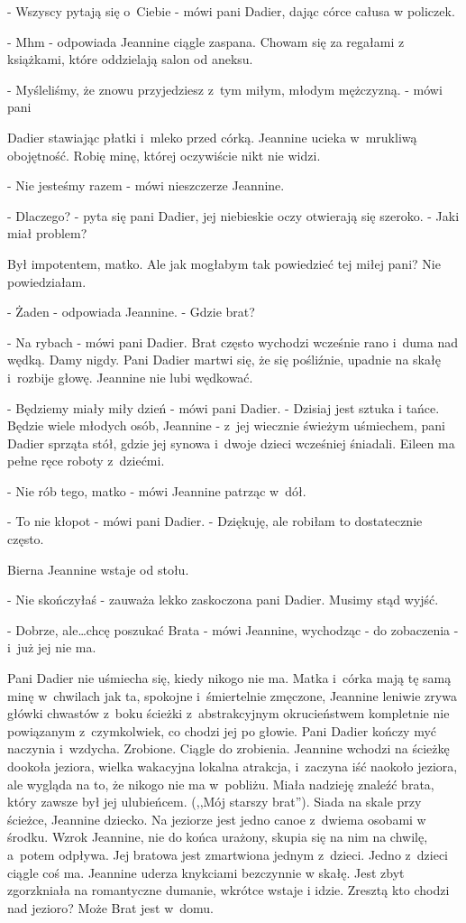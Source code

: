 \documentclass[oneside,polish,12pt,sfheadings]{mwbk}
\begin{document}
- Wszyscy pytają się o~Ciebie - mówi pani Dadier, dając córce całusa
w policzek.

- Mhm - odpowiada Jeannine ciągle zaspana. Chowam się za regałami
z książkami, które oddzielają salon od aneksu.

- Myśleliśmy, że znowu przyjedziesz z~tym miłym, młodym mężczyzną.
- mówi pani

Dadier stawiając płatki i~mleko przed córką. Jeannine ucieka w~mrukliwą
obojętność. Robię minę, której oczywiście nikt nie widzi.

- Nie jesteśmy razem - mówi nieszczerze Jeannine.

- Dlaczego? - pyta się pani Dadier, jej niebieskie oczy otwierają
się szeroko. - Jaki miał problem?

Był impotentem, matko. Ale jak mogłabym tak powiedzieć tej miłej pani?
Nie powiedziałam.

- Żaden - odpowiada Jeannine. - Gdzie brat?

- Na rybach - mówi pani Dadier. Brat często wychodzi wcześnie rano
i~duma nad wędką. Damy nigdy. Pani Dadier martwi się, że się pośliźnie,
upadnie na skałę i~rozbije głowę. Jeannine nie lubi wędkować.

- Będziemy miały miły dzień - mówi pani Dadier. - Dzisiaj jest sztuka
i tańce. Będzie wiele młodych osób, Jeannine - z~jej wiecznie świeżym
uśmiechem, pani Dadier sprząta stół, gdzie jej synowa i~dwoje dzieci
wcześniej śniadali. Eileen ma pełne ręce roboty z~dziećmi.

- Nie rób tego, matko - mówi Jeannine patrząc w~dół.

- To nie kłopot - mówi pani Dadier. - Dziękuję, ale robiłam to dostatecznie
często.

Bierna Jeannine wstaje od stołu. 

- Nie skończyłaś - zauważa lekko zaskoczona pani Dadier. Musimy stąd wyjść. 

- Dobrze, ale\ldots chcę poszukać Brata - mówi Jeannine, wychodząc - do zobaczenia - i~już jej nie ma.

Pani Dadier nie uśmiecha się, kiedy nikogo nie ma. Matka i~córka mają
tę samą minę w~chwilach jak ta, spokojne i~śmiertelnie zmęczone, Jeannine
leniwie zrywa główki chwastów z~boku ścieżki z~abstrakcyjnym okrucieństwem
kompletnie nie powiązanym z~czymkolwiek, co chodzi jej po głowie.
Pani Dadier kończy myć naczynia i~wzdycha. Zrobione. Ciągle do
zrobienia. Jeannine wchodzi na ścieżkę dookoła jeziora, wielka wakacyjna
lokalna atrakcja, i~zaczyna iść naokoło jeziora, ale wygląda na to,
że nikogo nie ma w~pobliżu. Miała nadzieję znaleźć brata, który zawsze
był jej ulubieńcem. (,,Mój starszy brat''). Siada na skale przy ścieżce,
Jeannine dziecko. Na jeziorze jest jedno canoe z~dwiema osobami w
środku. Wzrok Jeannine, nie do końca urażony, skupia się na nim na
chwilę, a~potem odpływa. Jej bratowa jest zmartwiona jednym z~dzieci.
Jedno z~dzieci ciągle coś ma. Jeannine uderza knykciami bezczynnie
w skałę. Jest zbyt zgorzkniała na romantyczne dumanie, wkrótce wstaje
i idzie. Zresztą kto chodzi nad jezioro? Może Brat jest w~domu.
\end{document}
